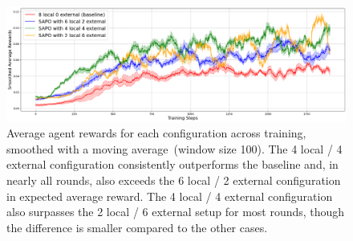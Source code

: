 \documentclass[11pt, a4paper, logo, singlecolumn, copyright]{gensyn}
\begin{document}
    
    
    


\begin{figure}[ht]
    \centering
    
    \includegraphics[width=\linewidth]{figures/SAPO.png}
    
    \caption{Average agent rewards for each configuration across training, smoothed with a moving average~(window size 100). The 4 local / 4 external configuration consistently outperforms the baseline and, in nearly all rounds, also exceeds the 6 local / 2 external configuration in expected average reward. The 4 local / 4 external configuration also surpasses the 2 local / 6 external setup for most rounds, though the difference is smaller compared to the other cases.}
    \label{fig:smooth_rewards}
\end{figure}
\end{document}
